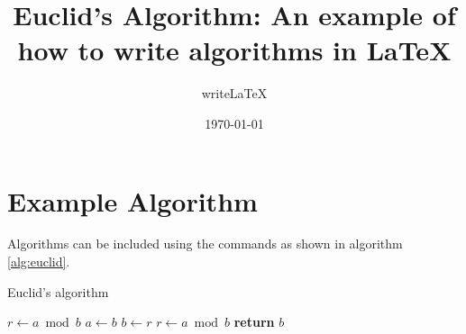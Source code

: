 \documentclass[a4paper]{article}
\title{Euclid's Algorithm: An example of how to write algorithms in \LaTeX{}}
\author{write\LaTeX{}}
\date{\today}
\begin{document}
\maketitle

\section{Example Algorithm}

Algorithms can be included using the commands as shown in algorithm \ref{alg:euclid}.

\begin{algorithm}
\caption{Euclid’s algorithm}\label{alg:euclid}
\begin{algorithmic}[1]
\State $r\gets a\bmod b$
\State $a\gets b$
\State $b\gets r$
\State $r\gets a\bmod b$
\EndWhile\label{euclidendwhile}
\State \textbf{return} $b$
\EndProcedure
\end{algorithmic}
\end{algorithm}
\end{document}
